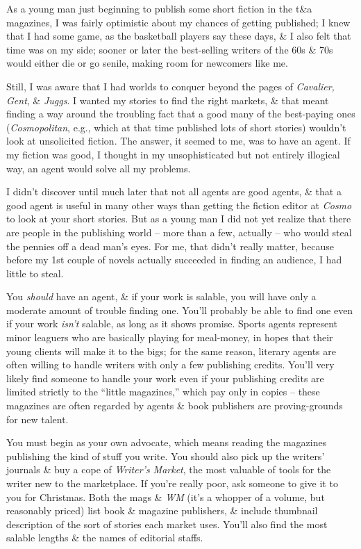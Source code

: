 \documentclass{article}
\numberwithin{equation}{section}
\begin{document}
As a young man just beginning to publish some short fiction in the t\&a magazines, I was fairly optimistic about my chances of getting published; I knew that I had some game, as the basketball players say these days, \& I also felt that time was on my side; sooner or later the best-selling writers of the 60s \& 70s would either die or go senile, making room for newcomers like me.

Still, I was aware that I had worlds to conquer beyond the pages of \textit{Cavalier, Gent}, \& \textit{Juggs}. I wanted my stories to find the right markets, \& that meant finding a way around the troubling fact that a good many of the best-paying ones (\textit{Cosmopolitan}, e.g., which at that time published lots of short stories) wouldn't look at unsolicited fiction. The answer, it seemed to me, was to have an agent. If my fiction was good, I thought in my unsophisticated but not entirely illogical way, an agent would solve all my problems.

I didn't discover until much later that not all agents are good agents, \& that a good agent is useful in many other ways than getting the fiction editor at \textit{Cosmo} to look at your short stories. But as a young man I did not yet realize that there are people in the publishing world -- more than a few, actually -- who would steal the pennies off a dead man's eyes. For me, that didn't really matter, because before my 1st couple of novels actually succeeded in finding an audience, I had little to steal.

You \textit{should} have an agent, \& if your work is salable, you will have only a moderate amount of trouble finding one. You'll probably be able to find one even if your work \textit{isn't} salable, as long as it shows promise. Sports agents represent minor leaguers who are basically playing for meal-money, in hopes that their young clients will make it to the bigs; for the same reason, literary agents are often willing to handle writers with only a few publishing credits. You'll very likely find someone to handle your work even if your publishing credits are limited strictly to the ``little magazines,'' which pay only in copies -- these magazines are often regarded by agents \& book publishers are proving-grounds for new talent.

You must begin as your own advocate, which means reading the magazines publishing the kind of stuff you write. You should also pick up the writers' journals \& buy a cope of \textit{Writer's Market}, the most valuable of tools for the writer new to the marketplace. If you're really poor, ask someone to give it to you for Christmas. Both the mags \& \textit{WM} (it's a whopper of a volume, but reasonably priced) list book \& magazine publishers, \& include thumbnail description of the sort of stories each market uses. You'll also find the most salable lengths \& the names of editorial staffs.
\end{document}
